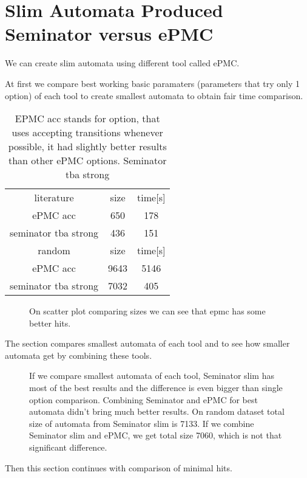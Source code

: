 \documentclass[
	digital
nolof, nolot
]{fithesis3}
\newcommand{\hlineny}{\hline}
\begin{document}
		\section{Slim Automata Produced Seminator versus ePMC}
		We can create slim automata using different tool called ePMC.
		
		At first we compare best working basic paramaters (parameters that try only 1 option) of each tool to create smallest automata to obtain fair time comparison.
	
	\begin{table}[ht]
		\centering
		\caption{EPMC acc stands for option, that uses accepting transitions whenever possible, it had slightly better results than other ePMC options. Seminator tba strong }
		\begin{tabular}{ |c||c|c| } 
			\hline
			literature&size&time[s]\\
			\hhline{|===|}
			ePMC acc&650 &178 \\
			\hline
			seminator tba strong &436 &151 \\
			\hlineny
			\hline
			random&size&time[s]\\
			\hhline{|===|}
			ePMC acc&9643 & 5146\\
			\hline
			seminator tba strong &7032 &405 \\
			\hlineny
		\end{tabular}
	\end{table}
	\begin{figure}[ht]
		\centering
		\caption{On scatter plot comparing sizes we can see that epmc has some better hits.}
		\begin{tikzpicture}
			
		\end{tikzpicture}
	\end{figure}
	
	
		The section compares smallest automata of each tool and to see how smaller automata get by combining these tools.
	
\begin{figure}[ht]
	\centering
	\caption{If we compare smallest automata of each tool, Seminator slim has most of the best results and the difference is even bigger than single option comparison. Combining Seminator and ePMC for best automata didn't bring much better results. On random dataset total size of automata from Seminator slim is 7133. If we combine Seminator slim and ePMC, we get total size 7060, which is not that significant difference.}
	\begin{tikzpicture}
		
	\end{tikzpicture}
\end{figure}
Then this section continues with comparison of minimal hits.
\end{document}
